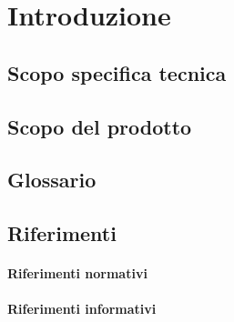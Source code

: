 \section{Introduzione}

\subsection{Scopo specifica tecnica}



\subsection{Scopo del prodotto}



\subsection{Glossario}


\subsection{Riferimenti}

\paragraph{Riferimenti normativi}

\paragraph{Riferimenti informativi}

